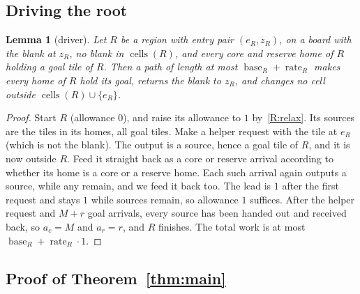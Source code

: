\documentclass[11pt]{amsart}
\newtheorem{lemma}[theorem]{Lemma}
\theoremstyle{definition}
\newcommand{\cells}{\operatorname{cells}}
\newcommand{\base}{\operatorname{base}}
\newcommand{\rate}{\operatorname{rate}}
\begin{document}
\subsection{Driving the root}

\begin{lemma}[driver]\label{lem:driver}
Let $R$ be a region with entry pair $(e_R,z_R)$, on a board with the blank at $z_R$, no blank in $\cells(R)$, and every core and reserve home of
$R$ holding a goal tile of $R$. Then a path of length at most $\base_R+\rate_R$ makes every home of $R$ hold its goal,
returns the blank to $z_R$, and changes no cell outside $\cells(R)\cup\{e_R\}$.
\end{lemma}

\begin{proof}
Start $R$ (allowance $0$), and raise its allowance to $1$ by~\ref{R:relax}. Its sources are the tiles in its homes, all goal tiles. Make a helper request with the tile at
$e_R$ (which is not the blank). The output is a source, hence a goal tile of $R$, and it is now outside $R$. Feed it straight
back as a core or reserve arrival according to whether its home is a core or a reserve home. Each such arrival again outputs a source, while any remain,
and we feed it back too. The lead is $1$ after the first request and stays $1$ while sources remain, so allowance $1$
suffices. After the helper request and $M+r$ goal arrivals, every source has been handed out and received back,
so $a_c=M$ and $a_r=r$, and $R$ finishes. The total work is at most $\base_R+\rate_R\cdot1$.
\end{proof}

\subsection{Proof of Theorem~\ref{thm:main}}
\end{document}
